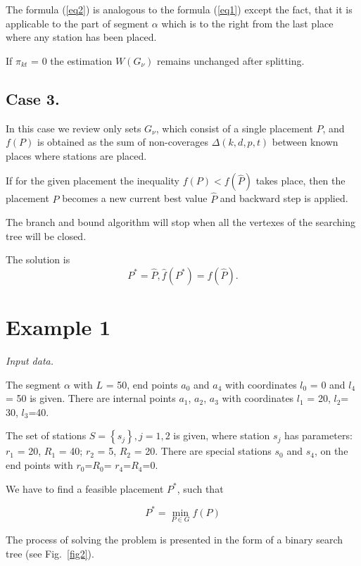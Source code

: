 The formula (\ref{eq2}) is analogous to the formula (\ref{eq1}) except the fact, that it is applicable to the part of segment $\alpha$ which is to the right from the last place where any station has been placed.

If $\pi_{kt}$ = 0 the estimation $W(G_{\nu})$ remains unchanged after splitting.

\subsection{Case 3.}
In this case we review only sets $G_\nu$, which consist of a single placement $P$, and $f(P)$ is obtained as the sum of non-coverages $\Delta(k,d,p,t)$ between known places where  stations are placed.

 If for the given placement the inequality $f(P) < f(\widehat{P})$ takes place, then the placement $P$ becomes a new current best value $\widehat{P}$ and backward step is applied.
 
The branch and bound algorithm will stop when all the vertexes of the searching tree will be closed.
 
The solution is
\begin{displaymath}
P^{*} = \widehat{P},  \widehat{f}(P^*) = f(\widehat{P}).
\end{displaymath}

\section{Example 1}

\textit{Input data.}

The segment $\alpha$  with $L$ = 50, end points $a_0$  and  $a_4$  with coordinates $l_0$ = 0 and $l_4$= 50 is given. There are internal  points $a_1$, $a_2$, $a_3$ with coordinates $l_1$ = 20, $l_2$= 30, $l_3$=40.

The set of stations $S=\left\{s_j\right\}, j=1,2$  is given, where station $s_j$ has parameters: $r_1$ = 20, $R_1$ = 40; $r_2$ = 5, $R_2$ = 20. There are special stations $s_0$ and $s_4$, on the end points with $r_0$=$R_0$= 
$r_4$=$R_4$=0.

We have to find a feasible placement $P^*$, such that

\begin{displaymath}
P^* = \min \limits_{P \in G} f(P)
\end{displaymath}

The process of solving the problem is presented in the form of a binary search tree (see Fig.~\ref{fig2}).
 
